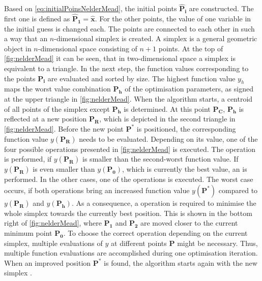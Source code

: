 Based on \autoref{eq:initialPoinsNelderMead}, the initial points $\mathbf{\hat{P}_i}$ are constructed. The first one is defined as $\mathbf{\hat{P}_1} = \mathbf{\hat{x}}$. For the other points, the value of one variable in the initial guess is changed each. The points are connected to each other in such a way that an $n$-dimensional simplex is created. A simplex is a general geometric object in $n$-dimensional space consisting of $n+1$ points. At the top of \autoref{fig:nelderMead} it can be seen, that in two-dimensional space a simplex is equivalent to a triangle.
In the next step, the function values corresponding to the points $\mathbf{P_i}$ are evaluated and sorted by size. The highest function value $y_h$ maps the worst value combination $\mathbf{P_h}$ of the optimisation parameters, as signed at the upper triangle in \autoref{fig:nelderMead}. When the algorithm starts, a centroid of all points of the simplex except $\mathbf{P_h}$ is determined. At this point $\mathbf{P_C}$, $\mathbf{P_h}$ is reflected at a new position $\mathbf{P_R}$, which is depicted in the second triangle in \autoref{fig:nelderMead}. Before the new point $\mathbf{P^{*}}$ is positioned, the corresponding function value $y(\mathbf{P_R})$ needs to be evaluated. Depending on its value, one of the four possible operations presented in \autoref{fig:nelderMead} is executed. 
The operation  is performed, if $y(\mathbf{P_R})$ is smaller than the second-worst function value. If $y(\mathbf{P_R})$ is even smaller than $y(\mathbf{P_0})$, which is currently the best value, an  is performed. In the other cases, one of the  operations is executed. The worst case occurs, if both  operations bring an increased function value $y(\mathbf{P^*})$ compared to $y(\mathbf{P_R})$ and $y(\mathbf{P_h})$. As a consequence, a  operation is required to minimise the whole simplex towards the currently best position. This is shown in the bottom right of \autoref{fig:nelderMead}, where $\mathbf{P_1}$ and $\mathbf{P_2}$ are moved closer to the current minimum point $\mathbf{P_0}$. To choose the correct operation depending on the current simplex, multiple evaluations of $y$ at different points $\mathbf{P}$ might be necessary. Thus, multiple function evaluations are accomplished during one optimisation iteration. When an improved position $\mathbf{P^{*}}$ is found, the algorithm starts again with the new simplex \cite{nelder_simplex_1965}. 

